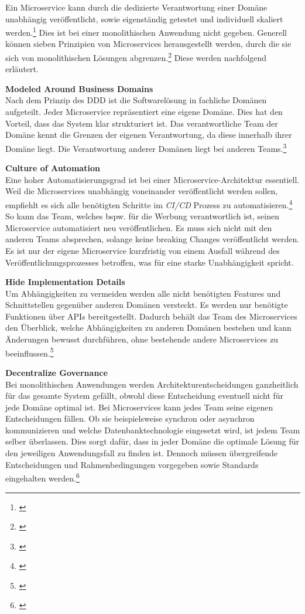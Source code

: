 Ein Microservice kann durch die dedizierte Verantwortung einer Domäne unabhängig veröffentlicht, sowie eigenständig getestet und individuell skaliert werden.\footnote{\cite[vgl.][]{Thoenes2015}} Dies ist bei einer monolithischen Anwendung nicht gegeben. Generell können sieben Prinzipien von Microservices herausgestellt werden, durch die sie sich von monolithischen Lösungen abgrenzen.\footnote{\cite[vgl.][16]{Mezzalira2021}} Diese werden nachfolgend erläutert.

\textbf{Modeled Around Business Domains}\\
Nach dem Prinzip des \gls{DDD} ist die Softwarelösung in fachliche Domänen aufgeteilt. Jeder Microservice repräsentiert eine eigene Domäne. Dies hat den Vorteil, dass das System klar strukturiert ist. Das verantwortliche Team der Domäne kennt die Grenzen der eigenen Verantwortung, da diese innerhalb ihrer Domäne liegt. Die Verantwortung anderer Domänen liegt bei anderen Teams.\footnote{\cite[vgl.][16\psq]{Mezzalira2021}}

\textbf{Culture of Automation}\\
Eine hoher Automatisierungsgrad ist bei einer Microservice-Architektur essentiell. Weil die Microservices unabhängig voneinander veröffentlicht werden sollen, empfiehlt es sich alle benötigten Schritte im \textit{\gls{CI/CD}} Prozess zu automatisieren.\footnote{\cite[vgl.][17]{Mezzalira2021}} So kann das Team, welches bspw. für die Werbung verantwortlich ist, seinen Microservice automatisiert neu veröffentlichen. Es muss sich nicht mit den anderen Teams absprechen, solange keine breaking Changes veröffentlicht werden. Es ist nur der eigene Microservice kurzfristig von einem Ausfall während des Veröffentlichungsprozesses betroffen, was für eine starke Unabhängigkeit spricht.

\textbf{Hide Implementation Details}\\
Um Abhängigkeiten zu vermeiden werden alle nicht benötigten Features und Schnittstellen gegenüber anderen Domänen versteckt. Es werden nur benötigte Funktionen über \gls{API}s bereitgestellt. Dadurch behält das Team des Microservices den Überblick, welche Abhängigkeiten zu anderen Domänen bestehen und kann Änderungen bewusst durchführen, ohne bestehende andere Microservices zu beeinflussen.\footnote{\cite[vgl.][17]{Mezzalira2021}}

\textbf{Decentralize Governance}\\
Bei monolithischen Anwendungen werden Architekturentscheidungen ganzheitlich für das gesamte System gefällt, obwohl diese Entscheidung eventuell nicht für jede Domäne optimal ist. Bei Microservices kann jedes Team seine eigenen Entscheidungen fällen. Ob sie beispielsweise synchron oder asynchron kommunizieren und welche Datenbanktechnologie eingesetzt wird, ist jedem Team selber überlassen. Dies sorgt dafür, dass in jeder Domäne die optimale Lösung für den jeweiligen Anwendungsfall zu finden ist. Dennoch müssen übergreifende Entscheidungen und Rahmenbedingungen vorgegeben sowie Standards eingehalten werden.\footnote{\cite[vgl.][17]{Mezzalira2021}}


